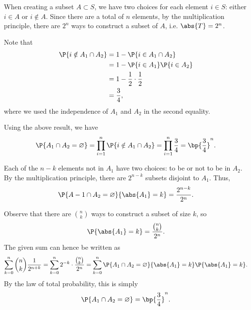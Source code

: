 \begin{solution}
    \begin{ppart}
        When creating a subset $A \subset S$, we have two choices for each element $i \in S$: either $i \in A$ or $i \notin A$. Since there are a total of $n$ elements, by the multiplication principle, there are $2^n$ ways to construct a subset of $A$, i.e. $\abs{T} = 2^n$.
    \end{ppart}
    \begin{ppart}
        \begin{psubpart}
            Note that
            \begin{align*}
                \P{i \notin A_1 \cap A_2} &= 1 - \P{i \in A_1 \cap A_2}\\
                &= 1 - \P{i \in A_1} \P{i \in A_2}\\
                &= 1 - \frac12 \cdot \frac12\\
                &= \frac34,
            \end{align*}
            where we used the independence of $A_1$ and $A_2$ in the second equality.
        \end{psubpart}
        \begin{psubpart}
            Using the above result, we have \[\P{A_1 \cap A_2 = \varnothing} = \prod_{i = 1}^n \P{i \notin A_1 \cap A_2} = \prod_{i = 1}^n \frac34 = \bp{\frac34}^n.\]
        \end{psubpart}
        \begin{psubpart}
            Each of the $n-k$ elements not in $A_1$ have two choices: to be or not to be in $A_2$. By the multiplication principle, there are $2^{n-k}$ subsets disjoint to $A_1$. Thus, \[\P{A-1 \cap A_2 = \varnothing}{\abs{A_1} = k} = \frac{2^{n-k}}{2^n}.\]
        \end{psubpart}
        \begin{psubpart}
            Observe that there are $\binom{n}{k}$ ways to construct a subset of size $k$, so \[\P{\abs{A_1} = k} = \frac{\binom{n}{k}}{2^n}.\] The given sum can hence be written as \[\sum_{k = 0}^n \binom{n}{k} \frac1{2^{n+k}} = \sum_{k = 0}^n 2^{-k} \cdot \frac{\binom{n}{k}}{2^n} = \sum_{k = 0}^n \P{A_1 \cap A_2 = \varnothing}{\abs{A_1} = k} \P{\abs{A_1} = k}.\] By the law of total probability, this is simply \[\P{A_1 \cap A_2 = \varnothing} = \bp{\frac34}^n.\]            
        \end{psubpart}
    \end{ppart}
    \begin{ppart}
        \begin{psubpart}

\end{psubpart}
\end{ppart}
\end{solution}
